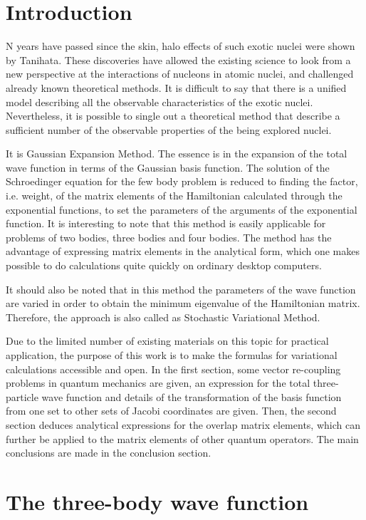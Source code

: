 \documentclass[12pt,a4paper,twoside]{article}
\begin{document}
\section*{Introduction}

N years have passed since the skin, halo effects of such exotic nuclei were shown by Tanihata. These discoveries have allowed the existing science to look from a new perspective at the interactions of nucleons in atomic nuclei, and challenged already known theoretical methods. It is difficult to say that there is a unified model describing all the observable characteristics of the exotic nuclei. Nevertheless, it is possible to single out a theoretical method that describe a sufficient number of the observable properties of the being explored nuclei.


It is Gaussian Expansion Method. The essence is in the expansion of the total wave function in terms of the Gaussian basis function. The solution of the Schroedinger equation for the few body problem is reduced to finding the factor, i.e. weight, of the matrix elements of the Hamiltonian calculated through the exponential functions, to set the parameters of the arguments of the exponential function. It is interesting to note that this method is easily applicable for problems of two bodies, three bodies and four bodies. The method has the advantage of expressing matrix elements in the analytical form, which one makes possible to do calculations quite quickly on ordinary desktop computers.

It should also be noted that in this method the parameters of the wave function are varied in order to obtain the minimum eigenvalue of the Hamiltonian matrix. Therefore, the approach is also called as Stochastic Variational Method.

Due to the limited number of existing materials on this topic for practical application, the purpose of this work is to make the formulas for variational calculations accessible and open. In the first section, some vector re-coupling problems in quantum mechanics are given, an expression for the total three-particle wave function and details of the transformation of the basis function from one set to other sets of Jacobi coordinates are given. Then, the second section deduces analytical expressions for the overlap matrix elements, which can further be applied to the matrix elements of other quantum operators. The main conclusions are made in the conclusion section.

\section*{The three-body wave function }
\end{document}
